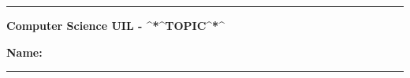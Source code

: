 \begin{center}
	\hrule
	\vspace{.4cm}
	{\textbf { \large Computer Science UIL - ^*^TOPIC^*^}}
\end{center}
\textbf{Name:}\  \hspace{\fill}  \\
\hrule
\newpage
